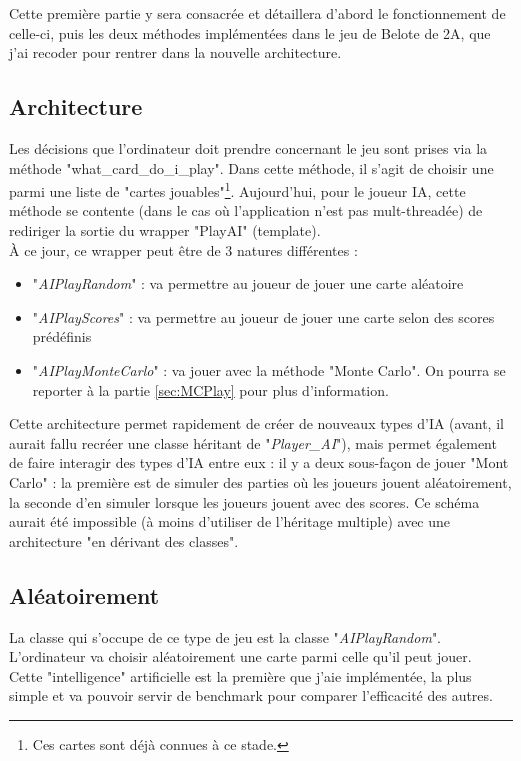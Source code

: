 \documentclass[a4paper,11pt]{article}
\begin{document}
Cette première partie y sera consacrée et détaillera d'abord le fonctionnement de celle-ci, puis les deux méthodes implémentées dans le jeu de Belote de 2A, que j'ai recoder pour rentrer dans la nouvelle architecture.
\subsection{Architecture}
Les décisions que l'ordinateur doit prendre concernant le jeu sont prises via la méthode "what\_card\_do\_i\_play". Dans cette méthode, il s'agit de choisir une parmi une liste de "cartes jouables"\footnote{Ces cartes sont déjà connues à ce stade.}. Aujourd'hui, pour le joueur IA, cette méthode se contente (dans le cas o\`u l'application n'est pas mult-threadée) de rediriger la sortie du wrapper "PlayAI" (template). \\

\`A ce jour, ce wrapper peut être de 3 natures différentes : 
\begin{itemize}
\item "\textit{AIPlayRandom}" : va permettre au joueur de jouer une carte aléatoire
\item "\textit{AIPlayScores}" : va permettre au joueur de jouer une carte selon des scores prédéfinis
\item "\textit{AIPlayMonteCarlo}" : va jouer avec la méthode "Monte Carlo". On pourra se reporter à la partie \ref{sec:MCPlay} pour plus d'information. \\
\end{itemize}

Cette architecture permet rapidement de créer de nouveaux types d'IA (avant, il aurait fallu recréer une classe héritant de "\textit{Player\_AI}"), mais permet également de faire interagir des types d'IA entre eux : il y a deux sous-façon de jouer "Mont Carlo" : la première est de simuler des parties o\`u les joueurs jouent aléatoirement, la seconde d'en simuler lorsque les joueurs jouent avec des scores. Ce schéma aurait été impossible (à moins d'utiliser de l'héritage multiple) avec une architecture "en dérivant des classes".
\subsection{Aléatoirement}
La classe qui s'occupe de ce type de jeu est la classe "\textit{AIPlayRandom}". L'ordinateur va choisir aléatoirement une carte parmi celle qu'il peut jouer. \\

Cette "intelligence" artificielle est la première que j'aie implémentée, la plus simple et va pouvoir servir de benchmark pour comparer l'efficacité des autres.
\end{document}
